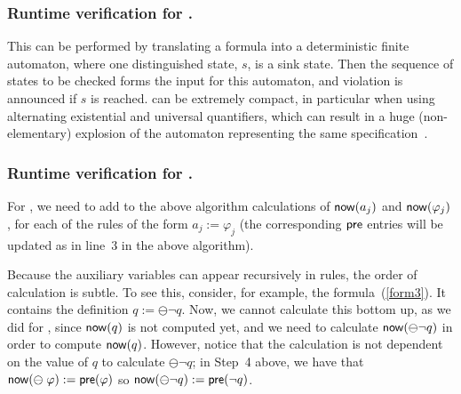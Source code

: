 \subsubsection*{Runtime verification for \QPLTL{}.}  This can be performed by translating a
formula into a deterministic finite automaton, where one distinguished state, $s$, is a sink state.
Then the sequence of states to be checked forms the input for this automaton, and violation is
announced if $s$ is reached.
\QPLTL{} can be extremely compact, in particular when using alternating existential and universal 
quantifiers, which can result in a huge (non-elementary) explosion of
the automaton representing the same
specification~\cite{Thomas}.


\subsubsection*{Runtime verification for \EPLTL{}.} For \EPLTL{},  we need to  add to the above
algorithm calculations 
of $\mathsf{now} ( a_j )$ and
$\mathsf{now} ( \varphi_j )$, for each of the rules of
the form $a_j := \varphi_j$ (the corresponding
$\mathsf{pre}$ entries will be updated as in line~3 in the above algorithm).


Because the
auxiliary variables can appear recursively in \EPLTL{} rules, the order of calculation is
subtle. To see this, consider, for example, the formula~(\ref{form3}). It contains
the definition $q := \ominus \neg q$. Now, we cannot calculate this
bottom up, as we did for \PLTL{}, since $\mathsf{now} ( q )$ is not computed yet, and we need 
to calculate $\mathsf{now} ( \ominus \neg q )$ in order 
to compute $\mathsf{now} ( q )$.
However, notice that the calculation is not dependent on the
value of $q$ to calculate $\ominus \neg q$; 
in Step~4 above, we have that
$\mathsf{now} ( \ominus \; \varphi ) := \mathsf{pre} ( \varphi )$
so  $\mathsf{now} ( \ominus \neg q ) := \mathsf{pre} ( \neg q )$.


